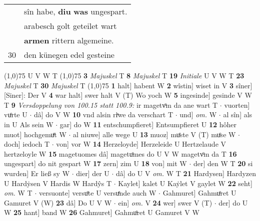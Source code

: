 \documentclass[8pt,a4paper,notitlepage]{article}
\begin{document}
\begin{table}[ht]
\begin{minipage}[t]{0.5\linewidth}
\begin{tabular}{rl}
 & sîn habe, \textbf{diu} \textbf{was} ungespart.\\ 
 & arabesch golt geteilet wart\\ 
 & \textbf{armen} rittern algemeine.\\ 
30 & den künegen edel gesteine\\ 
\end{tabular}
\scriptsize
\line(1,0){75} \newline
U V W T \newline
\line(1,0){75} \newline
\textbf{3} \textit{Majuskel} T  \textbf{8} \textit{Majuskel} T  \textbf{19} \textit{Initiale} U V W T  \textbf{23} \textit{Majuskel} T  \textbf{30} \textit{Majuskel} T  \newline
\line(1,0){75} \newline
\textbf{1} halt] habent W \textbf{2} wîstin] wiset in V \textbf{3} sîner] [Siner]: Der V \textbf{4} war halt] swer halt V (T) Wo yoch W \textbf{5} ingesinde] gesinde V W T \textbf{9} \textit{Versdoppelung von 100.15 statt 100.9:} ir magetvͦm da ane wart T   $\cdot$ vuorten] vuͦrte U  $\cdot$ dâ] do V W \textbf{10} vnd alsin riͮwe da verschart T  $\cdot$ und] \textit{om.} W  $\cdot$ al sîn] als in U Als sein W  $\cdot$ gar] do W \textbf{11} entschumpfieret] Entsumpfieret U \textbf{12} hôher muot] hochgemuͤt W  $\cdot$ al niuwe] alle wege U \textbf{13} muoz] muͤste V (T) muͦse W  $\cdot$ doch] iedoch T  $\cdot$ von] vor W \textbf{14} Herzeloyde] Herzeleide U Hertzelaude V hertzeloyle W \textbf{15} magetuomes dâ] magetuͦmes do U V W magetvͦm da T \textbf{16} ungespart] do nit gespart W \textbf{17} zern] zim U \textbf{18} von] mit W  $\cdot$ der] den W T \textbf{20} si wurden] Er ließ sy W  $\cdot$ dier] der U  $\cdot$ dâ] do U V \textit{om.} W T \textbf{21} Hardysen] Hardyzen U Hardẏsen V Hardis W Hardŷs T  $\cdot$ Kaylet] kalet U Kaẏlet V gaylet W \textbf{22} seht] \textit{om.} W T  $\cdot$ versuonte] versuͦte U versuͤnde auch W  $\cdot$ Gahmuret] Gahmuͦret U Gamuret V (W) \textbf{23} dâ] Do U V W  $\cdot$ ein] \textit{om.} V \textbf{24} wer] swer V (T)  $\cdot$ der] do U W \textbf{25} hant] band W \textbf{26} Gahmuret] Gahmuͦret U Gamuret V W \newline
\end{minipage}
\end{table}
\end{document}
